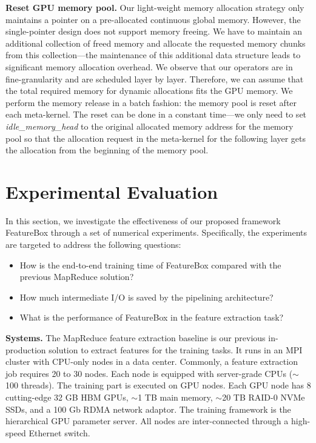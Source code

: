 \documentclass[sigconf]{acmart}
\begin{document}
\textbf{Reset GPU memory pool.} 
Our light-weight memory allocation strategy only maintains a pointer on a pre-allocated continuous global memory. However, the single-pointer design does not support memory freeing. 
We have to maintain an additional collection of freed memory and allocate the requested memory chunks from this collection---the maintenance of this additional data structure leads to significant memory allocation overhead. 
We observe that our operators are in fine-granularity and are scheduled layer by layer. Therefore, we can assume that the total required memory for dynamic allocations fits the GPU memory. We perform the memory release in a batch fashion: the memory pool is reset after each meta-kernel. The reset can be done in a constant time---we only need to set \textit{idle\_memory\_head} to the original allocated memory address for the memory pool so that the allocation request in the meta-kernel for the following layer gets the allocation from the beginning of the memory pool.



\section{Experimental Evaluation}
In this section, we investigate the effectiveness of our proposed framework FeatureBox through a set of numerical experiments. 
Specifically, the experiments are targeted to address the following questions:
\begin{itemize}
\item How is the end-to-end training time of FeatureBox compared with the previous MapReduce solution?
\item How much intermediate I/O is saved by the pipelining architecture?
\item What is the performance of FeatureBox in the feature extraction task?
\end{itemize}

\textbf{Systems.} 
The MapReduce feature extraction baseline is our previous in-production solution to extract features for the training tasks. It runs in an MPI cluster with CPU-only nodes in a data center. Commonly, a feature extraction job requires 20 to 30 nodes. Each node is equipped with server-grade CPUs ($\sim$100 threads). The training part is executed on GPU nodes. Each GPU node has 8 cutting-edge 32 GB HBM GPUs, $\sim$1 TB main memory, $\sim$20 TB RAID-0 NVMe SSDs, and a 100 Gb RDMA network adaptor. The training framework is the hierarchical GPU parameter server.
All nodes are inter-connected through a high-speed Ethernet switch. 
\end{document}
